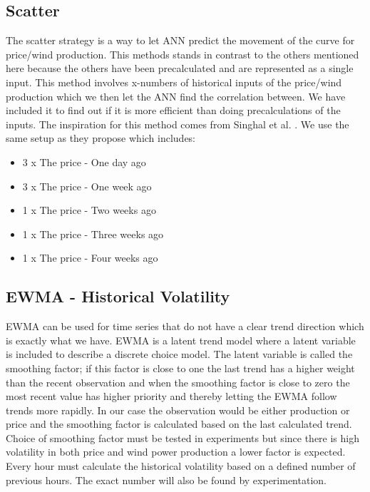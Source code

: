 \subsection{Scatter}
\label{sec:scatterStrategy}
The scatter strategy is a way to let ANN predict the movement of the curve for price/wind production. This methods stands in contrast to the others mentioned here because the others have been precalculated and are represented as a single input. This method involves x-numbers of historical inputs of the price/wind production which we then let the ANN find the correlation between. We have included it to find out if it is more efficient than doing precalculations of the inputs. The inspiration for this method comes from Singhal et al. \cite{singhal2011electricity}. We use the same setup as they propose which includes:

\begin{itemize}
	\item 3 x The price - One day ago
	\item 3 x The price - One week ago
	\item 1 x The price - Two weeks ago
	\item 1 x The price - Three weeks ago
	\item 1 x The price - Four weeks ago
\end{itemize}

\subsection{EWMA - Historical Volatility}
\label{sec:ewmaVolatility}
EWMA can be used for time series that do not have a clear trend direction\cite[Chapter~7.3.2]{econometrics} which is exactly what we have. EWMA is a latent trend model where a latent variable is included to describe a discrete choice model. The latent variable is called the smoothing factor; if this factor is close to one the last trend has a higher weight than the recent observation and when the smoothing factor is close to zero the most recent value has higher priority and thereby letting the EWMA follow trends more rapidly. In our case the observation would be either production or price and the smoothing factor is calculated based on the last calculated trend. Choice of smoothing factor must be tested in experiments but since there is high volatility in both price and wind power production a lower factor is expected. Every hour must calculate the historical volatility based on a defined number of previous hours. The exact number will also be found by experimentation.

